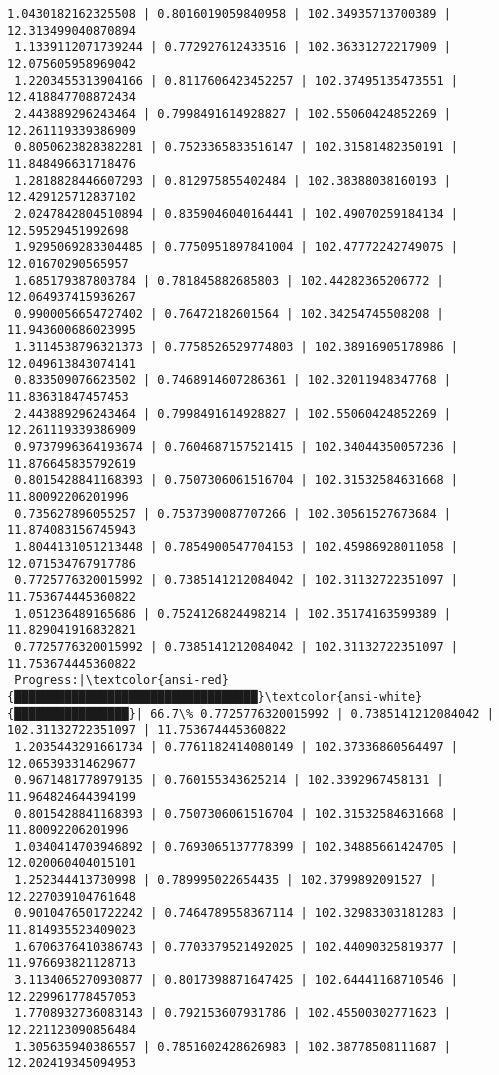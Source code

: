 \documentclass[11pt]{article}
\begin{document}
\begin{Verbatim}[commandchars=\\\{\}]
 1.0430182162325508 | 0.8016019059840958 | 102.34935713700389 | 12.313499040870894
 1.1339112071739244 | 0.772927612433516 | 102.36331272217909 | 12.075605958969042
 1.2203455313904166 | 0.8117606423452257 | 102.37495135473551 | 12.418847708872434
 2.443889296243464 | 0.7998491614928827 | 102.55060424852269 | 12.261119339386909
 0.8050623828382281 | 0.7523365833516147 | 102.31581482350191 | 11.848496631718476
 1.2818828446607293 | 0.812975855402484 | 102.38388038160193 | 12.429125712837102
 2.0247842804510894 | 0.8359046040164441 | 102.49070259184134 | 12.59529451992698
 1.9295069283304485 | 0.7750951897841004 | 102.47772242749075 | 12.01670290565957
 1.685179387803784 | 0.781845882685803 | 102.44282365206772 | 12.064937415936267
 0.9900056654727402 | 0.76472182601564 | 102.34254745508208 | 11.943600686023995
 1.3114538796321373 | 0.7758526529774803 | 102.38916905178986 | 12.049613843074141
 0.833509076623502 | 0.7468914607286361 | 102.32011948347768 | 11.83631847457453
 2.443889296243464 | 0.7998491614928827 | 102.55060424852269 | 12.261119339386909
 0.9737996364193674 | 0.7604687157521415 | 102.34044350057236 | 11.876645835792619
 0.8015428841168393 | 0.7507306061516704 | 102.31532584631668 | 11.80092206201996
 0.735627896055257 | 0.7537390087707266 | 102.30561527673684 | 11.874083156745943
 1.8044131051213448 | 0.7854900547704153 | 102.45986928011058 | 12.071534767917786
 0.7725776320015992 | 0.7385141212084042 | 102.31132722351097 | 11.753674445360822
 1.051236489165686 | 0.7524126824498214 | 102.35174163599389 | 11.829041916832821
 0.7725776320015992 | 0.7385141212084042 | 102.31132722351097 | 11.753674445360822
 Progress:|\textcolor{ansi-red}{██████████████████████████████████}\textcolor{ansi-white}{████████████████}| 66.7\% 0.7725776320015992 | 0.7385141212084042 | 102.31132722351097 | 11.753674445360822
 1.2035443291661734 | 0.7761182414080149 | 102.37336860564497 | 12.065393314629677
 0.9671481778979135 | 0.760155343625214 | 102.3392967458131 | 11.964824644394199
 0.8015428841168393 | 0.7507306061516704 | 102.31532584631668 | 11.80092206201996
 1.0340414703946892 | 0.7693065137778399 | 102.34885661424705 | 12.020060404015101
 1.252344413730998 | 0.789995022654435 | 102.3799892091527 | 12.227039104761648
 0.9010476501722242 | 0.7464789558367114 | 102.32983303181283 | 11.814935523409023
 1.6706376410386743 | 0.7703379521492025 | 102.44090325819377 | 11.976693821128713
 3.1134065270930877 | 0.8017398871647425 | 102.64441168710546 | 12.229961778457053
 1.7708932736083143 | 0.792153607931786 | 102.45500302771623 | 12.221123090856484
 1.305635940386557 | 0.7851602428626983 | 102.38778508111687 | 12.202419345094953

\end{Verbatim}
\end{document}
